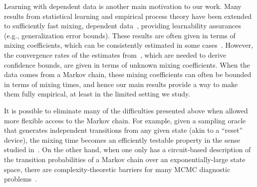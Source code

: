 Learning with dependent data is another main motivation to our work.
Many results from statistical learning and empirical process theory
have been extended to sufficiently fast mixing, dependent
data~\citep[e.g.,][]{Yu94,MR1921877,gamarnik03,MoRo08,MoRo09,DBLP:conf/nips/SteinwartC09,Steinwart2009175},
providing learnability assurances (e.g., generalization error bounds).
These results are often given in terms of mixing coefficients, which
can be consistently estimated in some cases~\citet{McDoShaSche11}.
However, the convergence rates of the estimates
from~\citet{McDoShaSche11}, which are needed to derive confidence
bounds, are given in terms of unknown mixing coefficients.
When the data comes from a Markov chain, these mixing coefficients can
often be bounded in terms of mixing times, and hence our main results
provide a way to make them fully empirical, at least in the limited setting we study.

It is possible to eliminate many of the difficulties presented above
when allowed more flexible access
to the Markov chain.
For example, given a sampling oracle that generates
independent transitions from any given state (akin to a ``reset''
device), the mixing time becomes an efficiently testable property in
the sense studied in~\citet{BaFoRuSmiWhi00,BaFoRuSmiWhi13}.
On the other hand, when one only has a circuit-based description of
the transition probabilities of a Markov chain over an
exponentially-large state space, there are complexity-theoretic
barriers for many MCMC diagnostic problems~\citet{BhaBoMo11}.
\fi
